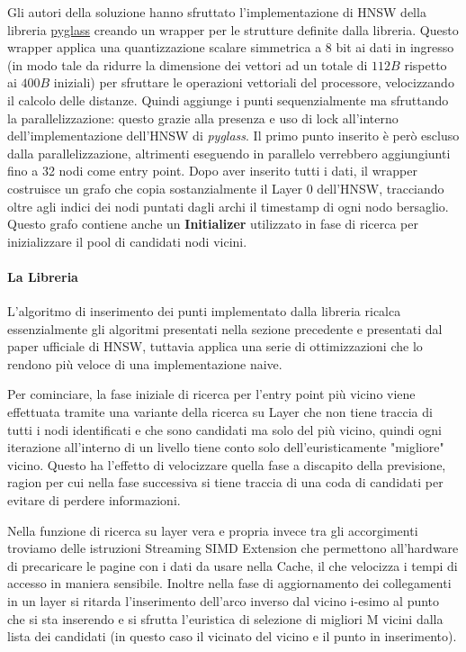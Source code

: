 Gli autori della soluzione hanno sfruttato l'implementazione di HNSW della libreria \href{https://github.com/zilliztech/pyglass/tree/master}{pyglass} creando un wrapper per le strutture definite dalla libreria.
Questo wrapper applica una quantizzazione scalare simmetrica a $8$ bit ai dati in ingresso (in modo tale da ridurre la dimensione 
dei vettori ad un totale di $112 B$ rispetto ai $400 B$ iniziali) per sfruttare le operazioni vettoriali del processore, velocizzando il calcolo delle distanze.
Quindi aggiunge i punti sequenzialmente ma sfruttando la parallelizzazione: questo grazie alla presenza e uso di lock all'interno dell'implementazione dell'HNSW di \textit{pyglass}.
Il primo punto inserito \`e per\`o escluso dalla parallelizzazione, altrimenti eseguendo in parallelo verrebbero aggiungiunti fino a 32 nodi come entry point.
Dopo aver inserito tutti i dati, il wrapper costruisce un grafo che copia sostanzialmente il Layer 0 dell'HNSW, tracciando oltre agli indici dei nodi puntati dagli archi il timestamp di ogni nodo bersaglio.
Questo grafo contiene anche un \textbf{Initializer} utilizzato in fase di ricerca per inizializzare il pool di candidati nodi vicini.

\paragraph{La Libreria}

L'algoritmo di inserimento dei punti implementato dalla libreria ricalca essenzialmente gli algoritmi presentati nella sezione precedente e presentati dal paper ufficiale di HNSW, tuttavia applica una serie di ottimizzazioni che lo rendono pi\`u veloce di una implementazione naive.

Per cominciare, la fase iniziale di ricerca per l'entry point pi\`u vicino viene effettuata tramite una variante della ricerca su Layer che non tiene traccia di tutti i nodi identificati e che sono candidati ma solo del pi\`u vicino, quindi ogni iterazione all'interno di un livello tiene conto solo dell'euristicamente "migliore" vicino.
Questo ha l'effetto di velocizzare quella fase a discapito della previsione, ragion per cui nella fase successiva si tiene traccia di una coda di candidati per evitare di perdere informazioni.

Nella funzione di ricerca su layer vera e propria invece tra gli accorgimenti troviamo delle istruzioni Streaming SIMD Extension che permettono all'hardware di precaricare le pagine con i dati da usare nella Cache, il che velocizza i tempi di accesso in maniera sensibile.
Inoltre nella fase di aggiornamento dei collegamenti in un layer si ritarda l'inserimento dell'arco inverso dal vicino i-esimo al punto che si sta inserendo e si sfrutta l'euristica di selezione di migliori M vicini dalla lista dei candidati (in questo caso il vicinato del vicino e il punto in inserimento).

